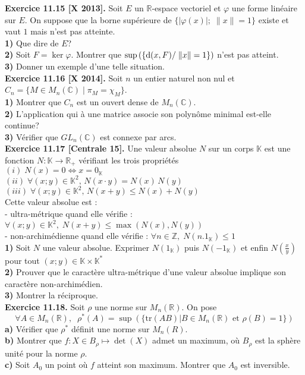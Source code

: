 \documentclass[a4paper,12pt,francais]{article}
\newcommand{\field}[1]{\mathbb{#1}}
\newcommand{\Z}{\field{Z}}
\newcommand{\R}{\field{R}}
\newcommand{\C}{\field{C}}
\newcommand{\K}{\field{K}}
\newcommand{\tr}{\mbox{tr}}
\begin{document}
\noindent
\noindent
{\bf Exercice 11.15 [X 2013].} Soit $E$ un $\R$-espace vectoriel et $\varphi$ une forme linéaire sur $E$. On suppose que la borne supérieure de $ \{ | \varphi(x) | ;\; \|x\|=1 \}$ existe et vaut $1$ mais n'est pas atteinte.\\
{\bf 1)} Que dire de $E$?\\
{\bf 2)} Soit $F=\ker \varphi$. Montrer que $\displaystyle \sup \left( \{ {\rm d}(x,F) /\; \|x\|=1 \} \right)$ n'est pas atteint.\\
{\bf 3)} Donner un exemple d'une telle situation.\\

\noindent
{\bf Exercice 11.16 [X 2014].} Soit $n$ un entier naturel non nul et $C_n=\{M\in M_n(\C) \; | \; \pi_M=\chi_M\}$.\\
{\bf 1)} Montrer que $C_n$ est un ouvert dense de $M_n(\C)$.\\
{\bf 2)} L'application qui à une matrice associe son polynôme minimal est-elle continue?\\
{\bf 3)} Vérifier que $GL_n(\C)$ est connexe par arcs.\\

\noindent %
{\bf Exercice 11.17 [Centrale 15].} Une valeur absolue $N$ sur un corps $\K$ est une fonction $N: \K \to \R_+$ vérifiant les trois propriétés\\
\indent
$(i) \; N(x)=0 \Leftrightarrow x=0_\K$\\
\indent
$(ii) \; \forall (x;y)\in \K^2, \, N(x\cdot y) = N(x)\, N(y)$\\
\indent
$(iii) \; \forall (x;y)\in \K^2, \, N(x+ y) \leqslant N(x)+N(y)$\\
Cette valeur absolue est :\\
\indent
- ultra-métrique quand elle vérifie :
$\forall (x;y) \in \K^2,\; N(x+y) \leqslant \max(N(x),N(y))$\\
\indent
- non-archimédienne quand  elle vérifie :
$\forall n \in \Z,\; N(n.1_\K) \leqslant 1$\\
{\bf 1)} Soit $N$ une valeur absolue. Exprimer $N(1_\K)$ puis  $N(-1_\K)$ et enfin $N\left( \frac{x}{y} \right)$ pour tout $(x;y)\in \K\times\K^*$\\
{\bf 2)} Prouver que le caractère ultra-métrique d'une valeur absolue implique son caractère non-archimédien.\\
{\bf 3)} Montrer la réciproque.\\

\noindent
{\bf Exercice 11.18.} Soit $\rho$ une norme sur $M_n(\R)$. On pose 
$$\forall A \in M_n(\R),\; \; \rho^*(A)=\sup\left( \{\tr(AB) | B \in 
M_n(\R) \mbox{ et } \rho(B)=1 \} \right)$$
{\bf a)} Vérifier que $\rho^*$ définit une norme sur $M_n(R)$.\\
{\bf b)} Montrer que $f : X \in B_\rho \mapsto \det(X)$ admet un maximum, où $B_\rho$ est la sphère unité pour la norme $\rho$.\\
{\bf c)} Soit $A_0$ un point où $f$ atteint son maximum. Montrer que $A_0$ est inversible.\\
\end{document}
